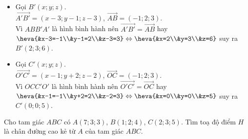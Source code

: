 \begin{vd}
{\begin{itemize}
			\item Gọi $ B'(x;y;z) $.\\
			$ \vec{A'B'}=(x-3;y-1;z-3) $, $ \vec{AB}=(-1;2;3) $.\\
			Vì $ ABB'A' $ là hình bình hành nên $ \vec{A'B'}=\vec{AB} $ hay \\
			$ \heva{&x-3=-1\\&y-1=2\\&z-3=3}\Leftrightarrow \heva{&x=2\\&y=3\\&z=6} $ suy ra $ B'(2;3;6) $.
			\item Gọi $ C'(x;y;z) $.\\
			$ \vec{O'C'}=(x-1;y+2;z-2) $, $ \vec{OC}=(-1;2;3) $.\\
			Vì $ OCC'O' $ là hình bình hành nên $ \vec{O'C'}=\vec{OC} $ hay\\
			$ \heva{&x-1=-1\\&y+2=2\\&z-2=3}\Leftrightarrow \heva{&x=0\\&y=0\\&z=5} $ suy ra $ C'(0;0;5) $.
		\end{itemize}
		
		
	}
\end{vd}

\begin{vd}%
	Cho tam giác $ABC$ có $A(7; 3; 3)$, $B(1; 2; 4)$, $C(2; 3; 5)$. Tìm toạ độ điểm $H$ là chân đường cao kẻ từ $A$ của tam giác $ABC$.
\end{vd}

